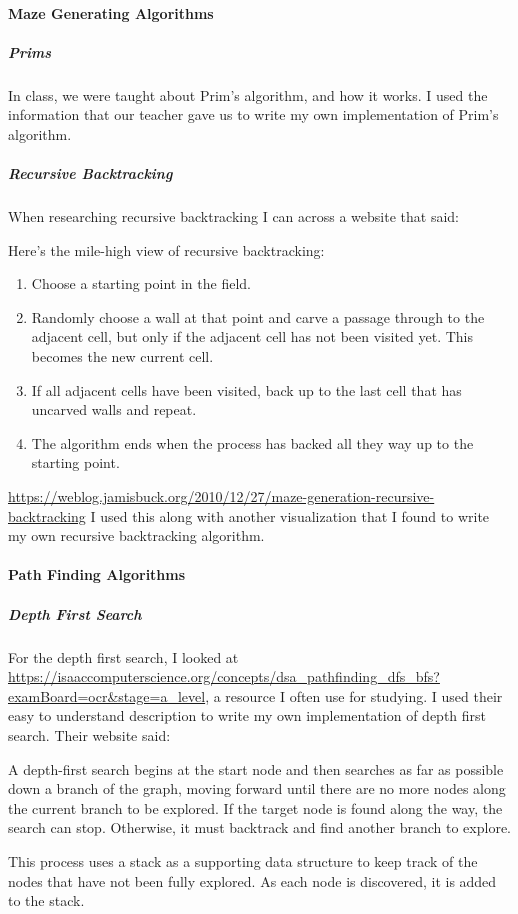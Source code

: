 \documentclass[titlepage]{article}
\begin{document}
\paragraph{Maze Generating Algorithms}
\subparagraph*{Prims}
In class, we were taught about Prim's algorithm, and how it works. I used the information that our teacher gave us to write my own implementation of Prim's algorithm.
\subparagraph*{Recursive Backtracking}
When researching recursive backtracking I can across a website that said:
\begin{quoting}
    Here's the mile-high view of recursive backtracking:
    \begin{enumerate}
        \item Choose a starting point in the field.
        \item Randomly choose a wall at that point and carve a passage through to the adjacent cell, but only if the adjacent cell has not been visited yet. This becomes the new current cell.
        \item If all adjacent cells have been visited, back up to the last cell that has uncarved walls and repeat.
        \item The algorithm ends when the process has backed all they way up to the starting point. 
    \end{enumerate}
\end{quoting}
\url{https://weblog.jamisbuck.org/2010/12/27/maze-generation-recursive-backtracking}
I used this along with another visualization that I found to write my own recursive backtracking algorithm.

\paragraph{Path Finding Algorithms}
\subparagraph*{Depth First Search}
For the depth first search, I looked at \url{https://isaaccomputerscience.org/concepts/dsa_pathfinding_dfs_bfs?examBoard=ocr&stage=a_level}, a resource I often use for studying. I used their easy to understand description to write my own implementation of depth first search. Their website said:
\begin{quoting}
    A depth-first search begins at the start node and then searches as far as possible down a branch of the graph, moving forward until there are no more nodes along the current branch to be explored. If the target node is found along the way, the search can stop. Otherwise, it must backtrack and find another branch to explore.

    This process uses a stack as a supporting data structure to keep track of the nodes that have not been fully explored. As each node is discovered, it is added to the stack.
\end{quoting}
\end{document}

